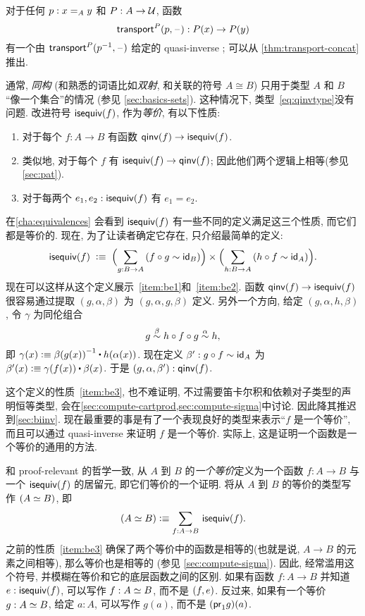 \begin{eg}\label{thm:transportequiv}
  对于任何 $p:\id[A]xy$ 和 $P:A\to\type$, 函数
  \[\transfib{P}{p}{\blank}:P(x) \to P(y)\]
  有一个由 $\transfib{P}{\opp p}{\blank}$ 给定的  quasi-inverse ; 可以从 \narrowbreak \cref{thm:transport-concat} 推出.
\end{eg}

通常, \emph{同构}
(和熟悉的词语比如\emph{双射}, 和关联的符号 $A\cong B$)
只用于类型 $A$ 和 $B$ ``像一个集合''的情况 (参见 \cref{sec:basics-sets}).
这种情况下, 类型~\eqref{eq:qinvtype}没有问题.
改进符号 $\isequiv (f)$, 作为\emph{等价}, 有以下性质:%
\begin{enumerate}
    \item 对于每个 $f:A\to B$ 有函数 $\qinv(f) \to \isequiv (f)$.\label{item:be1}
    \item 类似地, 对于每个 $f$ 有 $\isequiv (f) \to \qinv(f)$; 因此他们两个逻辑上相等(参见 \cref{sec:pat}).\label{item:be2}
    \item 对于每两个 $e_1,e_2:\isequiv(f)$ 有 $e_1=e_2$.\label{item:be3}
\end{enumerate}
在\cref{cha:equivalences} 会看到 $\isequiv(f)$ 有一些不同的定义满足这三个性质, 而它们都是等价的.
现在, 为了让读者确定它存在, 只介绍最简单的定义:
\begin{equation}\label{eq:isequiv-invertible}
  \isequiv(f) \;\defeq\;
  \Parens{\sm{g:B\to A} (f\circ g \htpy \idfunc[B])}
  \times
  \Parens{\sm{h:B\to A} (h\circ f \htpy \idfunc[A])}.
\end{equation}
现在可以这样从这个定义展示~\ref{item:be1}和~\ref{item:be2}.
函数 $\qinv(f) \to \isequiv (f)$ 很容易通过提取 $(g,\alpha,\beta)$ 为 $(g,\alpha,g,\beta)$ 定义.
另外一个方向, 给定 $(g,\alpha,h,\beta)$, 令 $\gamma$ 为同伦组合
\[ g \overset{\beta}{\htpy} h\circ f\circ g \overset{\alpha}{\htpy} h, \]
即 $\gamma(x) \defeq \opp{\beta(g(x))} \ct \ap{h}{\alpha(x)}$.
现在定义 $\beta':g\circ f\htpy \idfunc[A]$ 为 $\beta'(x) \defeq \gamma(f(x)) \ct \beta(x)$.
于是 $(g,\alpha,\beta'):\qinv(f)$.

这个定义的性质~\ref{item:be3}, 也不难证明, 不过需要笛卡尔积和依赖对子类型的声明恒等类型, 会在\cref{sec:compute-cartprod,sec:compute-sigma}中讨论.
因此降其推迟到\cref{sec:biinv}.
现在最重要的事是有了一个表现良好的类型来表示``$f$ 是一个等价'', 而且可以通过 quasi-inverse 来证明 $f$ 是一个等价.
实际上, 这是证明一个函数是一个等价的通用的方法.

和 proof-relevant 的哲学一致,
%
从 $A$ 到 $B$ 的\emph{一个等价}定义为一个函数 $f:A\to B$ 与一个 $\isequiv (f)$ 的居留元, 即它们等价的一个证明.
将从 $A$ 到 $B$ 的等价的类型写作 $(\eqv A B)$, 即
\begin{equation}\label{eq:eqv}
  (\eqv A B) \defeq \sm{f:A\to B} \isequiv(f).
\end{equation}
之前的性质~\ref{item:be3} 确保了两个等价中的函数是相等的(也就是说, $A\to B$ 的元素之间相等), 那么等价也是相等的 (参见 \cref{sec:compute-sigma}).
因此, 经常滥用这个符号, 并模糊在等价和它的底层函数之间的区别.
如果有函数 $f:A\to B$ 并知道 $e:\isequiv(f)$, 可以写作 $f:\eqv A B$, 而不是 $\tup{f}{e}$.
反过来, 如果有一个等价 $g:\eqv A B$, 给定 $a:A$, 可以写作 $g(a)$, 而不是 $(\proj1 g)(a)$.

